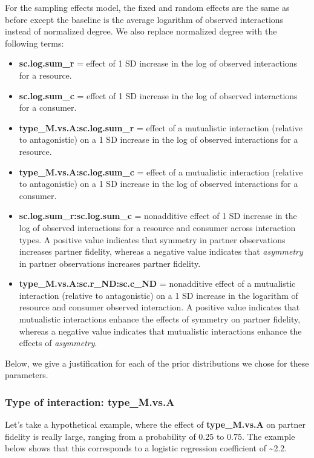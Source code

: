 \documentclass[11pt,]{article}
\providecommand{\tightlist}{%
  \setlength{\itemsep}{0pt}\setlength{\parskip}{0pt}}
\begin{document}
For the sampling effects model, the fixed and random effects are the
same as before except the baseline is the average logarithm of observed
interactions instead of normalized degree. We also replace normalized
degree with the following terms:

\begin{itemize}
\tightlist
\item
  \textbf{sc.log.sum\_r} = effect of 1 SD increase in the log of
  observed interactions for a resource.
\item
  \textbf{sc.log.sum\_c} = effect of 1 SD increase in the log of
  observed interactions for a consumer.
\item
  \textbf{type\_M.vs.A:sc.log.sum\_r} = effect of a mutualistic
  interaction (relative to antagonistic) on a 1 SD increase in the log
  of observed interactions for a resource.
\item
  \textbf{type\_M.vs.A:sc.log.sum\_c} = effect of a mutualistic
  interaction (relative to antagonistic) on a 1 SD increase in the log
  of observed interactions for a consumer.
\item
  \textbf{sc.log.sum\_r:sc.log.sum\_c} = nonadditive effect of 1 SD
  increase in the log of observed interactions for a resource and
  consumer across interaction types. A positive value indicates that
  symmetry in partner observations increases partner fidelity, whereas a
  negative value indicates that \emph{asymmetry} in partner observations
  increases partner fidelity.
\item
  \textbf{type\_M.vs.A:sc.r\_ND:sc.c\_ND} = nonadditive effect of a
  mutualistic interaction (relative to antagonistic) on a 1 SD increase
  in the logarithm of resource and consumer observed interaction. A
  positive value indicates that mutualistic interactions enhance the
  effects of symmetry on partner fidelity, whereas a negative value
  indicates that mutualistic interactions enhance the effects of
  \emph{asymmetry}.
\end{itemize}

Below, we give a justification for each of the prior distributions we
chose for these parameters.

\subsubsection{\texorpdfstring{Type of interaction:
\textbf{type\_M.vs.A}}{Type of interaction: type\_M.vs.A}}\label{type-of-interaction-type_m.vs.a}

Let's take a hypothetical example, where the effect of
\textbf{type\_M.vs.A} on partner fidelity is really large, ranging from
a probability of 0.25 to 0.75. The example below shows that this
corresponds to a logistic regression coefficient of
\textasciitilde{}2.2.
\end{document}
